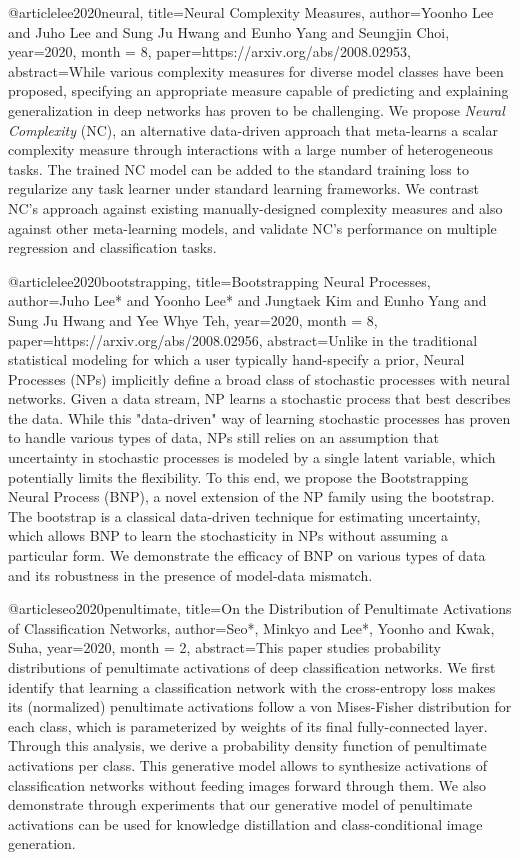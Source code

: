 
@article{lee2020neural,
    title={Neural Complexity Measures},
    author={Yoonho Lee and Juho Lee and Sung Ju Hwang and Eunho Yang and Seungjin Choi},
    year={2020},
    month = {8},
    paper={https://arxiv.org/abs/2008.02953},
    abstract={While various complexity measures for diverse model classes have been proposed, specifying an appropriate measure capable of predicting and explaining generalization in deep networks has proven to be challenging. We propose \textit{Neural Complexity} (NC), an alternative data-driven approach that meta-learns a scalar complexity measure through interactions with a large number of heterogeneous tasks. The trained NC model can be added to the standard training loss to regularize any task learner under standard learning frameworks. We contrast NC's approach against existing manually-designed complexity measures and also against other meta-learning models, and validate NC's performance on multiple regression and classification tasks. }
}

@article{lee2020bootstrapping,
    title={Bootstrapping Neural Processes},
    author={Juho Lee* and Yoonho Lee* and Jungtaek Kim and Eunho Yang and Sung Ju Hwang and Yee Whye Teh},
    year={2020},
    month = {8},
    paper={https://arxiv.org/abs/2008.02956},
    abstract={Unlike in the traditional statistical modeling for which a user typically hand-specify a prior, Neural Processes (NPs) implicitly define a broad class of stochastic processes with neural networks. Given a data stream, NP learns a stochastic process that best describes the data. While this "data-driven" way of learning stochastic processes has proven to handle various types of data, NPs still relies on an assumption that uncertainty in stochastic processes is modeled by a single latent variable, which potentially limits the flexibility. To this end, we propose the Bootstrapping Neural Process (BNP), a novel extension of the NP family using the bootstrap. The bootstrap is a classical data-driven technique for estimating uncertainty, which allows BNP to learn the stochasticity in NPs without assuming a particular form. We demonstrate the efficacy of BNP on various types of data and its robustness in the presence of model-data mismatch.}
}

@article{seo2020penultimate,
  title={On the Distribution of Penultimate Activations of Classification Networks},
  author={Seo*, Minkyo and Lee*, Yoonho and Kwak, Suha},
  year={2020},
  month = {2},
  abstract={This paper studies probability distributions of penultimate activations of deep classification networks. We first identify that learning a classification network with the cross-entropy loss makes its (normalized) penultimate activations follow a von Mises-Fisher distribution for each class, which is parameterized by weights of its final fully-connected layer. Through this analysis, we derive a probability density function of penultimate activations per class. This generative model allows to synthesize activations of classification networks without feeding images forward through them. We also demonstrate through experiments that our generative model of penultimate activations can be used for knowledge distillation and class-conditional image generation.}
}

